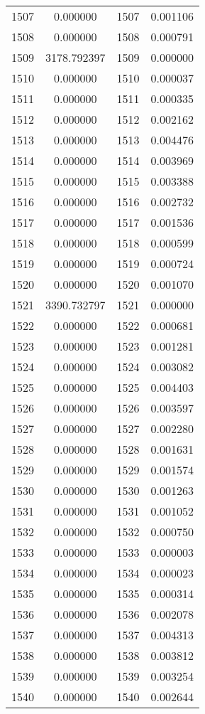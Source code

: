 \documentclass[12pt]{article}
\begin{document}
\begin{longtable}{@{}cccc@{}}
1507 & 0.000000 & 1507 & 0.001106 \\
1508 & 0.000000 & 1508 & 0.000791 \\
1509 & 3178.792397 & 1509 & 0.000000 \\
1510 & 0.000000 & 1510 & 0.000037 \\
1511 & 0.000000 & 1511 & 0.000335 \\
1512 & 0.000000 & 1512 & 0.002162 \\
1513 & 0.000000 & 1513 & 0.004476 \\
1514 & 0.000000 & 1514 & 0.003969 \\
1515 & 0.000000 & 1515 & 0.003388 \\
1516 & 0.000000 & 1516 & 0.002732 \\
1517 & 0.000000 & 1517 & 0.001536 \\
1518 & 0.000000 & 1518 & 0.000599 \\
1519 & 0.000000 & 1519 & 0.000724 \\
1520 & 0.000000 & 1520 & 0.001070 \\
1521 & 3390.732797 & 1521 & 0.000000 \\
1522 & 0.000000 & 1522 & 0.000681 \\
1523 & 0.000000 & 1523 & 0.001281 \\
1524 & 0.000000 & 1524 & 0.003082 \\
1525 & 0.000000 & 1525 & 0.004403 \\
1526 & 0.000000 & 1526 & 0.003597 \\
1527 & 0.000000 & 1527 & 0.002280 \\
1528 & 0.000000 & 1528 & 0.001631 \\
1529 & 0.000000 & 1529 & 0.001574 \\
1530 & 0.000000 & 1530 & 0.001263 \\
1531 & 0.000000 & 1531 & 0.001052 \\
1532 & 0.000000 & 1532 & 0.000750 \\
1533 & 0.000000 & 1533 & 0.000003 \\
1534 & 0.000000 & 1534 & 0.000023 \\
1535 & 0.000000 & 1535 & 0.000314 \\
1536 & 0.000000 & 1536 & 0.002078 \\
1537 & 0.000000 & 1537 & 0.004313 \\
1538 & 0.000000 & 1538 & 0.003812 \\
1539 & 0.000000 & 1539 & 0.003254 \\
1540 & 0.000000 & 1540 & 0.002644 \\

\end{longtable}
\end{document}
